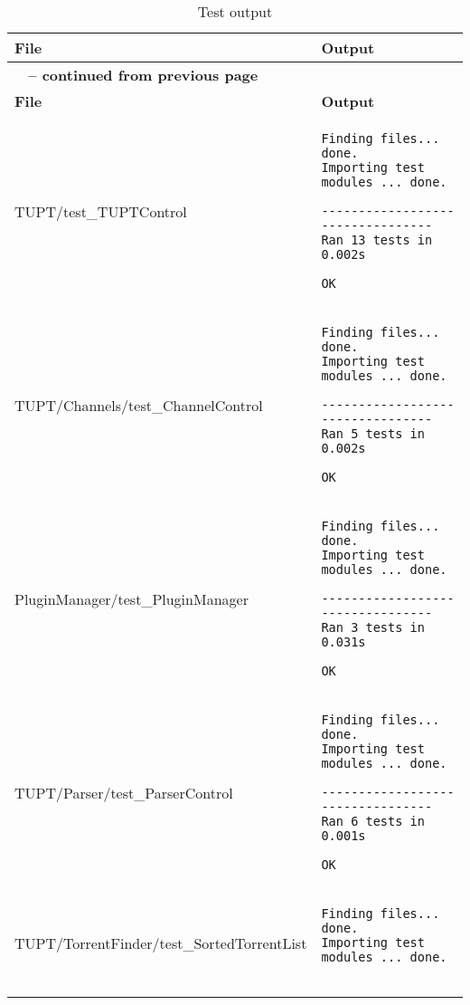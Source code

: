 \begin{center}
\begin{longtable}{| p{} | p{} |}
\caption[Test output]{Test output}  \label{tab:rantests}\\

\hline \multicolumn{1}{|p{0.5\textwidth}|}{\textbf{File}} & \multicolumn{1}{p{0.5\textwidth}|}{\textbf{Output}} \\ \hline \hline
\endfirsthead

\multicolumn{2}{l}{\bfseries \tablename\ \thetable{} -- continued from previous page}\\
\hline \multicolumn{1}{|p{0.5\textwidth}|}{\textbf{File}} & \multicolumn{1}{p{0.5\textwidth}|}{\textbf{Output}} \\ \hline \hline
\endhead

\hline
\endfoot

\hline \hline
\endlastfoot

    TUPT/test\_TUPTControl & 
\begin{verbatim}
Finding files... done.
Importing test modules ... done.

---------------------------------
Ran 13 tests in 0.002s

OK
\end{verbatim}\\ \hline
    TUPT/Channels/test\_ChannelControl  & 
\begin{verbatim}
Finding files... done.
Importing test modules ... done.

---------------------------------
Ran 5 tests in 0.002s

OK
\end{verbatim}\\ \hline
    PluginManager/test\_PluginManager & 
\begin{verbatim}
Finding files... done.
Importing test modules ... done.

---------------------------------
Ran 3 tests in 0.031s

OK
\end{verbatim}\\ \hline
    TUPT/Parser/test\_ParserControl & 
\begin{verbatim}
Finding files... done.
Importing test modules ... done.

---------------------------------
Ran 6 tests in 0.001s

OK
\end{verbatim}\\ \hline
    \small{TUPT/TorrentFinder/test\_SortedTorrentList} & 
\begin{verbatim}
Finding files... done.
Importing test modules ... done.


\end{verbatim}
\end{longtable}
\end{center}
